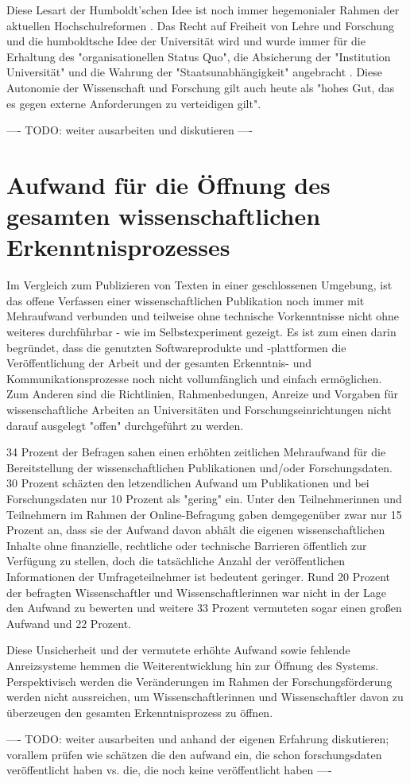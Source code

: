 Diese Lesart der Humboldt’schen Idee ist noch immer hegemonialer Rahmen der aktuellen Hochschulreformen \cite{Huber_2005}. Das Recht auf Freiheit von Lehre und Forschung und die humboldtsche Idee der Universität wird und wurde immer für die Erhaltung des "organisationellen Status Quo", die Absicherung der "Institution Universität" und die Wahrung der "Staatsunabhängigkeit" angebracht \cite{Huber_2005}. Diese Autonomie der Wissenschaft und Forschung gilt auch heute als "hohes Gut, das es gegen externe Anforderungen zu verteidigen gilt"\cite{kaldewey_2010}.

---- TODO: weiter ausarbeiten und diskutieren ----

\section{Aufwand für die Öffnung des gesamten wissenschaftlichen Erkenntnisprozesses}

Im Vergleich zum Publizieren von Texten in einer geschlossenen Umgebung, ist das offene Verfassen einer wissenschaftlichen Publikation noch immer mit Mehraufwand verbunden und teilweise ohne technische Vorkenntnisse nicht ohne weiteres durchführbar - wie im Selbstexperiment gezeigt. Es ist zum einen darin begründet, dass die genutzten Softwareprodukte und -plattformen die Veröffentlichung der Arbeit und der gesamten Erkenntnis- und Kommunikationsprozesse noch nicht vollumfänglich und einfach ermöglichen. Zum Anderen sind die Richtlinien, Rahmenbedungen, Anreize und Vorgaben für wissenschaftliche Arbeiten an Universitäten und Forschungseinrichtungen nicht darauf ausgelegt "offen" durchgeführt zu werden.

34 Prozent der Befragen sahen einen erhöhten zeitlichen Mehraufwand für die Bereitstellung der wissenschaftlichen Publikationen und/oder Forschungsdaten. 30 Prozent schäzten den letzendlichen Aufwand um Publikationen und bei Forschungsdaten nur 10 Prozent als "gering" ein. Unter den Teilnehmerinnen und Teilnehmern im Rahmen der Online-Befragung gaben demgegenüber zwar nur 15 Prozent an, dass sie der Aufwand davon abhält die eigenen wissenschaftlichen Inhalte ohne finanzielle, rechtliche oder technische Barrieren öffentlich zur Verfügung zu stellen, doch die tatsächliche Anzahl der veröffentlichen Informationen der Umfrageteilnehmer ist bedeutent geringer. Rund 20 Prozent der befragten Wissenschaftler und Wissenschaftlerinnen war nicht in der Lage den Aufwand zu bewerten und weitere 33 Prozent vermuteten sogar einen großen Aufwand  und 22 Prozent.

Diese Unsicherheit und der vermutete erhöhte Aufwand sowie fehlende Anreizsysteme hemmen die Weiterentwicklung hin zur Öffnung des Systems. Perspektivisch werden die Veränderungen im Rahmen der Forschungsförderung werden nicht aussreichen, um Wissenschaftlerinnen und Wissenschaftler davon zu überzeugen den gesamten Erkenntnisprozess zu öffnen.

---- TODO: weiter ausarbeiten und anhand der eigenen Erfahrung diskutieren; vorallem prüfen wie schätzen die den aufwand ein, die schon forschungsdaten veröffentlicht haben vs. die, die noch keine veröffentlicht haben ----

